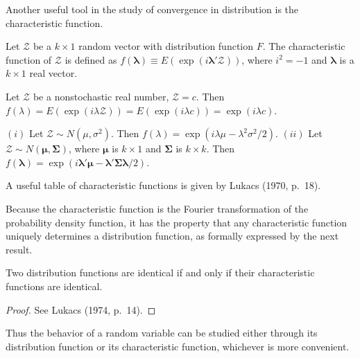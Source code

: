 Another useful tool in the study of convergence in distribution is the
characteristic function.

\begin{definition}\label{def:4.8}
Let $\mathcal{Z}$ be a $k \times 1$ random vector with distribution function $F$. The characteristic function of $\mathcal{Z}$ is defined as $f(\boldsymbol{\lambda}) \equiv E(\exp(i\boldsymbol{\lambda}'\mathcal{Z}))$, where $i^2 = -1$ and $\boldsymbol{\lambda}$ is a $k \times 1$ real vector.
\end{definition}

\begin{example}\label{ex:4.9}
Let $\mathcal{Z}$ be a nonstochastic real number, $\mathcal{Z} = c$. Then $f(\lambda) = E(\exp(i\lambda \mathcal{Z})) = E(\exp(i\lambda c)) = \exp(i\lambda c)$.
\end{example}

\begin{example}\label{ex:4.10}
$(i)$ Let $\mathcal{Z} \sim N(\mu, \sigma^2)$. Then $f(\lambda) = \exp(i\lambda\mu - \lambda^2\sigma^2/2)$.
$(ii)$ Let $\mathcal{Z} \sim N(\boldsymbol{\mu}, \boldsymbol{\Sigma})$, where $\boldsymbol{\mu}$ is $k \times 1$ and $\boldsymbol{\Sigma}$ is $k \times k$. Then $f(\boldsymbol{\lambda}) = \exp(i\boldsymbol{\lambda}'\boldsymbol{\mu} - \boldsymbol{\lambda}'\boldsymbol{\Sigma}\boldsymbol{\lambda}/2)$.
\end{example}

A useful table of characteristic functions is given by Lukacs (1970, p.~18).

Because the characteristic function is the Fourier transformation of the
probability density function, it has the property that any characteristic
function uniquely determines a distribution function, as formally expressed
by the next result.

\begin{theorem}\label{thm:4.11}
Two distribution functions are identical if and only if their characteristic functions are identical.
\end{theorem}

\begin{proof}
See Lukacs (1974, p.~14).
\end{proof}

Thus the behavior of a random variable can be studied either through
its distribution function or its characteristic function, whichever is more
convenient.

